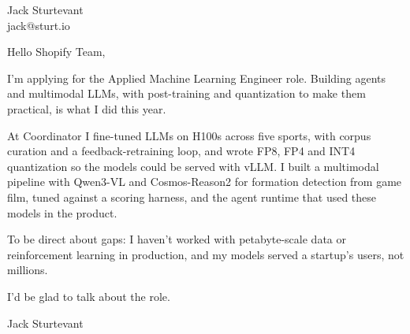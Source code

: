 \documentclass[11pt]{article}
\begin{document}
\raggedright

{\namefont\fontsize{20pt}{24pt}\selectfont Jack Sturtevant}\\[-0.3em]
jack@sturt.io

\vspace{1.2em}

Hello Shopify Team,

I'm applying for the Applied Machine Learning Engineer role. Building agents and multimodal LLMs, with post-training and quantization to make them practical, is what I did this year.

At Coordinator I fine-tuned LLMs on H100s across five sports, with corpus curation and a feedback-retraining loop, and wrote FP8, FP4 and INT4 quantization so the models could be served with vLLM. I built a multimodal pipeline with Qwen3-VL and Cosmos-Reason2 for formation detection from game film, tuned against a scoring harness, and the agent runtime that used these models in the product.

To be direct about gaps: I haven't worked with petabyte-scale data or reinforcement learning in production, and my models served a startup's users, not millions.

I'd be glad to talk about the role.

\vspace{0.6em}
Jack Sturtevant
\end{document}
